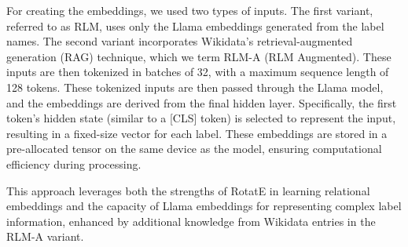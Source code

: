 For creating the embeddings, we used two types of inputs.
The first variant, referred to as RLM, uses only the Llama embeddings generated from the label names.
The second variant incorporates Wikidata's retrieval-augmented generation (RAG) technique, which we term RLM-A (RLM Augmented).
These inputs are then tokenized in batches of 32, with a maximum sequence length of 128 tokens.
These tokenized inputs are then passed through the Llama model, and the embeddings are derived from the final hidden layer.
Specifically, the first token's hidden state (similar to a [CLS] token) is selected to represent the input, resulting in a fixed-size vector for each label.
These embeddings are stored in a pre-allocated tensor on the same device as the model, ensuring computational efficiency during processing.

This approach leverages both the strengths of RotatE in learning relational embeddings and the capacity of Llama embeddings for representing complex label information,
enhanced by additional knowledge from Wikidata entries in the RLM-A variant.
